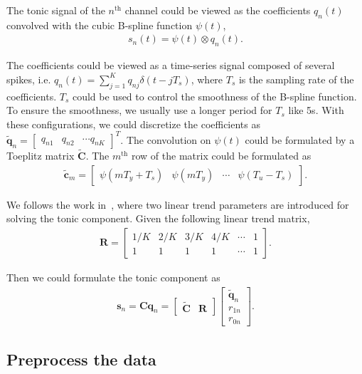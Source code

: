 \documentclass[10pt,conference]{ieeeconf}
\begin{document}
The tonic signal of the $n^{\mathrm{th}}$ channel could be viewed as the coefficients $q_n (t)$ convolved with the cubic B-spline function $\psi(t)$,
\begin{align}
s_n(t) =  \psi(t) \otimes q_n (t).
\end{align}

The coefficients could be viewed as a time-series signal composed of several spikes, i.e. $q_n (t) = \sum_{j=1}^K q_{nj} \delta(t - jT_s)$, where $T_s$ is the sampling rate of the coefficients. $T_s$ could be used to control the smoothness of the B-spline function. To ensure the smoothness, we usually use a longer period for $T_s$ like 5s. With these configurations, we could discretize the coefficients as $\tilde{\mathbf{q}}_n = \begin{bmatrix}
q_{n1} & q_{n2} & \cdots q_{nK}
\end{bmatrix}^T$.
The convolution on $\psi(t)$ could be formulated by a Toeplitz matrix $\tilde{\mathbf{C}}$. The $m^{\mathrm{th}}$ row of the matrix could be formulated as
\begin{align}
\tilde{\mathbf{c}}_m = \begin{bmatrix}
\psi(mT_y + T_s) & \psi(mT_y) & \cdots & \psi(T_u - T_s)
\end{bmatrix}.
\end{align}

We follows the work in~\cite{greco2015cvxeda}, where two linear trend parameters are introduced for solving the tonic component. Given the following linear trend matrix,
\begin{align}
  \mathbf{R} = \begin{bmatrix}
    1/K & 2/K & 3/K & 4/K & \cdots & 1 \\
    1 & 1 & 1 & 1 & \cdots & 1 
  \end{bmatrix}.
\end{align}

Then we could formulate the tonic component as
\begin{align}
\mathbf{s}_n = \mathbf{C} \mathbf{q}_n = \begin{bmatrix}
  \tilde{\mathbf{C}} & \mathbf{R}
\end{bmatrix} \begin{bmatrix}
  \tilde{\mathbf{q}}_n \\ r_{1n} \\ r_{0n}
\end{bmatrix}.
\end{align}

\subsection{Preprocess the data}
\end{document}

